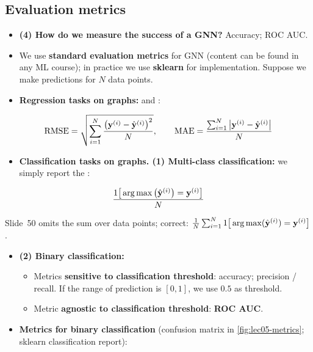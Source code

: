 \subsection{Evaluation metrics}\label{sec:lec05-metrics}

\begin{itemize}
  \item \textbf{(4) How do we measure the success of a GNN?} Accuracy; ROC AUC.
  \item We use \textbf{standard evaluation metrics} for GNN (content can be
    found in any ML course); in practice we use \textbf{sklearn} for
    implementation. Suppose we make predictions for $N$ data points.
  \item \textbf{Regression tasks on graphs:}  and :
\end{itemize}
\begin{equation}\label{eq:lec05-rmse}
  \mathrm{RMSE} = \sqrt{\sum_{i=1}^{N}\frac{\big(\mathbf{y}^{(i)}-\hat{\mathbf{y}}^{(i)}\big)^2}{N}},
  \qquad
  \mathrm{MAE} = \frac{\sum_{i=1}^{N}\big|\mathbf{y}^{(i)}-\hat{\mathbf{y}}^{(i)}\big|}{N}
\end{equation}
\begin{itemize}
  \item \textbf{Classification tasks on graphs. (1) Multi-class
    classification:} we simply report the :
\end{itemize}
\begin{equation}\label{eq:lec05-acc}
  \frac{1\big[\operatorname*{arg\,max}\big(\hat{\mathbf{y}}^{(i)}\big)=\mathbf{y}^{(i)}\big]}{N}
\end{equation}
\begin{caution}
  Slide~50 omits the sum over data points; correct:
  $\frac{1}{N}\sum_{i=1}^{N}1\big[\operatorname*{arg\,max}(\hat{\mathbf{y}}^{(i)})=\mathbf{y}^{(i)}\big]$.
\end{caution}
\begin{itemize}
  \item \textbf{(2) Binary classification:}
    \begin{itemize}
      \item Metrics \textbf{sensitive to classification threshold}: accuracy;
        precision / recall. If the range of prediction is $[0,1]$, we use $0.5$
        as threshold.
      \item Metric \textbf{agnostic to classification threshold}: \textbf{ROC
        AUC}.
    \end{itemize}
  \item \textbf{Metrics for binary classification} (confusion matrix in
    \cref{fig:lec05-metrics}; sklearn classification report):
\end{itemize}
